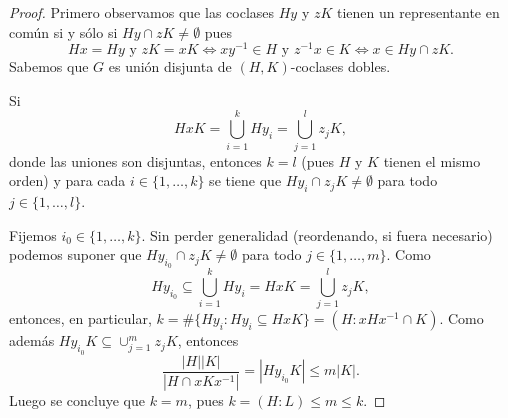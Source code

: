 \begin{proof}
    Primero observamos que las coclases $Hy$ y $zK$ tienen un representante en común si y sólo si 
    $Hy\cap zK\ne\emptyset$ pues 
    \[
    Hx=Hy\text{ y }zK=xK
    \Longleftrightarrow xy^{-1}\in H\text{ y }z^{-1}x\in K
    \Longleftrightarrow x\in Hy\cap zK.
    \]
    Sabemos que $G$ es unión disjunta de $(H,K)$-coclases dobles. 
    
    \begin{claim} 
    Si 
    \[
    HxK=\bigcup_{i=1}^kHy_i=\bigcup_{j=1}^lz_jK,
    \]
    donde las uniones son disjuntas, entonces $k=l$ (pues $H$ y $K$ tienen el mismo orden)  
    y para cada $i\in\{1,\dots,k\}$ se tiene que $Hy_i\cap z_jK\ne\emptyset$ para todo $j\in\{1,\dots,l\}$. 
    \end{claim}
    
    Fijemos $i_0\in\{1,\dots,k\}$. Sin perder generalidad (reordenando, si fuera necesario) podemos suponer que 
    $Hy_{i_0}\cap z_jK\ne\emptyset$ para todo $j\in\{1,\dots,m\}$. Como 
    \[
    Hy_{i_0}\subseteq \bigcup_{i=1}^kHy_i=Hx K=\bigcup_{j=1}^lz_jK,
    \]
    entonces, en particular, $k=\#\{Hy_i:Hy_i\subseteq  HxK\}=(H:xHx^{-1}\cap K)$. 
    Como además $Hy_{i_0}K\subseteq\cup_{j=1}^mz_jK$, 
    entonces 
    \[
    \frac{|H||K|}{|H\cap xKx^{-1}|}=|Hy_{i_0}K|\leq m|K|.
    \]
    Luego se concluye que $k=m$, pues $k=(H:L)\leq m\leq k$. 
\end{proof}